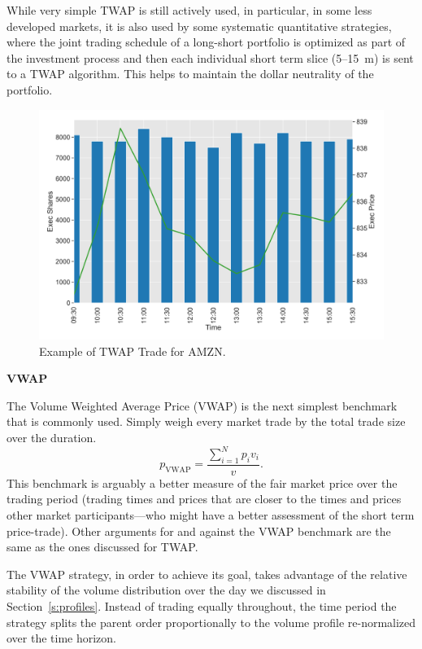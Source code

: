 While very simple TWAP is still actively used, in particular, in some less developed markets, it is also used by some systematic quantitative strategies, where the joint trading schedule of a long-short portfolio is optimized as part of the investment process and then each individual short term slice (5--15~m) is sent to a TWAP algorithm. This helps to maintain the dollar neutrality of the portfolio. \twomedskip

        \begin{figure}[!ht]
        \centering
        \includegraphics[width=\textwidth]{chapters/chapter_exec_models/figures/twap.png} 
        \caption{Example of TWAP Trade for AMZN. \label{fig:vwap}}
        \end{figure}


\noindent\textbf{VWAP} \twomedskip


The Volume Weighted Average Price (VWAP) is the next simplest benchmark that is commonly used. Simply weigh every market trade by the total trade size over the duration.
        \begin{equation} \label{eq:vwapstet}
        p_\text{VWAP}= \dfrac{ \sum_{i=1}^N p_i v_i}{v}.
        \end{equation}
This benchmark  is arguably a better measure of the fair market price over the trading period (trading times and prices that are closer to the times and prices other market participants---who might have a better assessment of the short term price-trade). Other arguments for and against the VWAP benchmark are the same as the ones discussed for TWAP. 


The VWAP strategy, in order to achieve its goal, takes advantage of the relative stability of the volume distribution over the day we discussed in Section~\ref{s:profiles}. Instead of trading equally throughout, the time period the strategy splits the parent order proportionally to the volume profile re-normalized over the time horizon.


